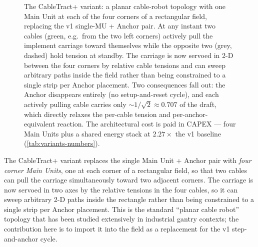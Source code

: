 \documentclass[11pt,a4paper]{article}
\begin{document}
\begin{figure}[H]
{%
}
\caption{The CableTract+ variant: a planar cable-robot topology with one Main Unit at each of the four corners of a rectangular field, replacing the v1 single-MU + Anchor pair. At any instant two cables (\textcolor{green!50!black}{green}, e.g.\ from the two left corners) actively pull the implement carriage toward themselves while the opposite two (\textcolor{gray!40!black}{grey}, dashed) hold tension at standby. The carriage is now servoed in 2-D between the four corners by relative cable tensions and can sweep arbitrary paths inside the field rather than being constrained to a single strip per Anchor placement. Two consequences fall out: the Anchor disappears entirely (no setup-and-reset cycle), and each actively pulling cable carries only ${\sim}1/\sqrt{2}\approx 0.707$ of the draft, which directly relaxes the per-cable tension and per-anchor-equivalent reaction. The architectural cost is paid in CAPEX --- four Main Units plus a shared energy stack at $2.27\times$ the v1 baseline (\cref{tab:variants-numbers}).}
\label{fig:f0e}
\end{figure}

The CableTract+ variant replaces the single Main Unit + Anchor pair with \emph{four corner Main Units}, one at each corner of a rectangular field, so that two cables can pull the carriage simultaneously toward two adjacent corners. The carriage is now servoed in two axes by the relative tensions in the four cables, so it can sweep arbitrary 2-D paths inside the rectangle rather than being constrained to a single strip per Anchor placement. This is the standard ``planar cable robot'' topology that has been studied extensively in industrial gantry contexts; the contribution here is to import it into the field as a replacement for the v1 step-and-anchor cycle.
\end{document}

